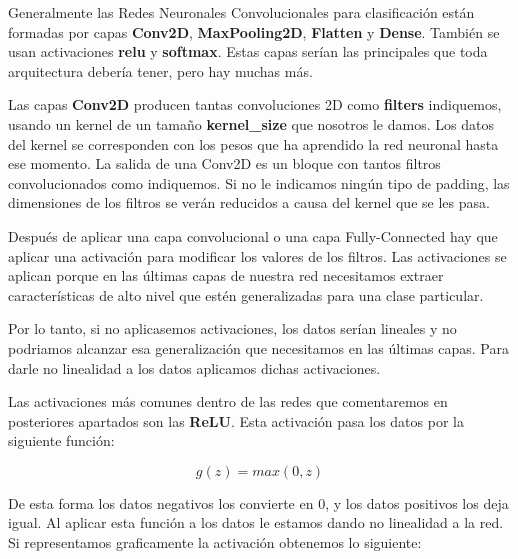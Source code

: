 \vspace{5 mm}

Generalmente las Redes Neuronales Convolucionales para clasificación están formadas por capas \textbf{Conv2D}\cite{conv2d}, \textbf{MaxPooling2D}\cite{maxpooling2d}, \textbf{Flatten}\cite{flatten} y \textbf{Dense}\cite{dense}. También se usan activaciones \textbf{relu}\cite{relu} y \textbf{softmax}\cite{softmax}. Estas capas serían las principales que toda arquitectura debería tener, pero hay muchas más.

\vspace{2 mm}

Las capas \textbf{Conv2D} producen tantas convoluciones 2D como \textbf{filters} indiquemos, usando un kernel de un tamaño \textbf{kernel\_size} que nosotros le damos. Los datos del kernel se corresponden con los pesos que ha aprendido la red neuronal hasta ese momento. La salida de una Conv2D es un bloque con tantos filtros convolucionados como indiquemos. Si no le indicamos ningún tipo de padding, las dimensiones de los filtros se verán reducidos a causa del kernel que se les pasa.

\vspace{2 mm}

Después de aplicar una capa convolucional o una capa Fully-Connected hay que aplicar una activación para modificar los valores de los filtros. Las activaciones se aplican porque en las últimas capas de nuestra red necesitamos extraer características de alto nivel que estén generalizadas para una clase particular.

\vspace{2 mm}

Por lo tanto, si no aplicasemos activaciones, los datos serían lineales y no podriamos alcanzar esa generalización que necesitamos en las últimas capas. Para darle no linealidad a los datos aplicamos dichas activaciones.

\vspace{2 mm}

Las activaciones más comunes dentro de las redes que comentaremos en posteriores apartados son las \textbf{ReLU}\cite{relu}. Esta activación pasa los datos por la siguiente función:

\[g(z) = max(0, z)\]

De esta forma los datos negativos los convierte en 0, y los datos positivos los deja igual. Al aplicar esta función a los datos le estamos dando no linealidad a la red. Si representamos graficamente la activación obtenemos lo siguiente:

